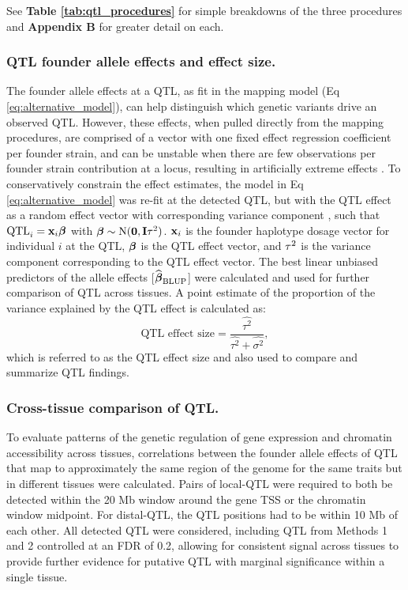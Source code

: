 See \textbf{Table \ref{tab:qtl_procedures}} for simple breakdowns of the three procedures and \textbf{Appendix B} for greater detail on each.

\subsubsection{QTL founder allele effects and effect size.} 

The founder allele effects at a QTL, as fit in the mapping model (Eq \ref{eq:alternative_model}), can help distinguish which genetic variants drive an observed QTL. However, these effects, when pulled directly from the mapping procedures, are comprised of a vector with one fixed effect regression coefficient per founder strain, and can be unstable when there are few observations per founder strain contribution at a locus, resulting in artificially extreme effects \citep{Zhang2014}. To conservatively constrain the effect estimates, the model in Eq \ref{eq:alternative_model} was re-fit at the detected QTL, but with the QTL effect as a random effect vector with corresponding variance component \citep{Wei2016}, such that $\text{QTL}_{i} = \mathbf{x}_{i}\boldsymbol{\beta}$ with $\boldsymbol{\beta} \sim \text{N}(\mathbf{0}, \mathbf{I}\tau^{2})$. $\mathbf{x}_{i}$ is the founder haplotype dosage vector for individual $i$ at the QTL, $\boldsymbol{\beta}$ is the QTL effect vector, and $\tau^{2}$ is the variance component corresponding to the QTL effect vector. The best linear unbiased predictors of the allele effects [$\widehat{\boldsymbol{\beta}}_{\text{BLUP}}$] \citep{Robinson1991} were calculated and used for further comparison of QTL across tissues. A point estimate of the proportion of the variance explained by the QTL effect is calculated as:
\begin{equation}
    \text{QTL effect size} = \frac{\widehat{\tau^{2}}}{\widehat{\tau^{2}} + \widehat{\sigma^{2}}},
    \label{eq:effect_size}
\end{equation} which is referred to as the QTL effect size and also used to compare and summarize QTL findings. 

\subsubsection{Cross-tissue comparison of QTL.}

To evaluate patterns of the genetic regulation of gene expression and chromatin accessibility across tissues, correlations between the founder allele effects of QTL that map to approximately the same region of the genome for the same traits but in different tissues were calculated. Pairs of local-QTL were required to both be detected within the 20 Mb window around the gene TSS or the chromatin window midpoint. For distal-QTL, the QTL positions had to be within 10 Mb of each other. All detected QTL were considered, including QTL from Methods 1 and 2 controlled at an FDR of 0.2, allowing for consistent signal across tissues to provide further evidence for putative QTL with marginal significance within a single tissue.


